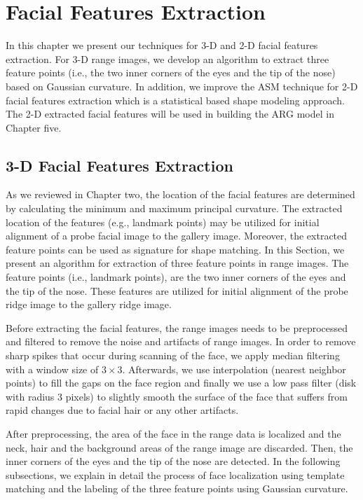 \chapter{Facial Features Extraction} In this chapter we present
our techniques for 3-D and 2-D facial features extraction. For 3-D
range images, we develop an algorithm to extract three feature
points (i.e., the two inner corners of the eyes and the tip of the
nose) based on Gaussian curvature. In addition, we improve the ASM
technique for 2-D facial features extraction which is a statistical
based shape modeling approach. The 2-D extracted facial features
will be used in building the ARG model in Chapter five.

\section{3-D Facial Features Extraction}
As we reviewed in Chapter two, the location of the facial features
are determined by calculating the minimum and maximum principal
curvature. The extracted location of the features (e.g., landmark
points) may be utilized for initial alignment of a probe facial
image to the gallery image. Moreover, the extracted feature points
can be used as signature for shape matching. In this Section, we
present an algorithm for extraction of three feature points in range
images. The feature points (i.e., landmark points), are the two
inner corners of the eyes and the tip of the nose. These features
are utilized for initial alignment of the probe ridge image to the
gallery ridge image.

Before extracting the facial features, the range images needs to be
preprocessed and filtered to remove the noise and artifacts of range
images. In order to remove sharp spikes that occur during scanning
of the face, we apply median filtering with a window size of
$3\times3$. Afterwards, we use interpolation (nearest neighbor
points) to fill the gaps on the face region and finally we use a low
pass filter (disk with radius 3 pixels) to slightly smooth the
surface of the face that suffers from rapid changes due to facial
hair or any other artifacts.

After preprocessing, the area of the face in the range data is
localized and the neck, hair and the background areas of the range
image are discarded. Then, the inner corners of the eyes and the tip
of the nose are detected. In the following subsections, we explain
in detail the process of face localization using template matching
and the labeling of the three feature points using Gaussian
curvature.

